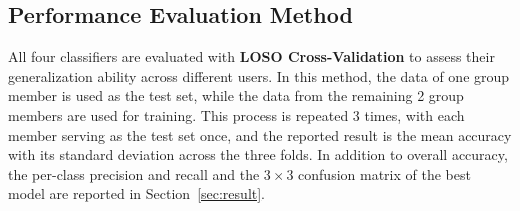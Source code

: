 \subsection{Performance Evaluation Method}
All four classifiers are evaluated with \textbf{LOSO Cross-Validation} to assess their generalization ability across different users. In this method, the data of one group member is used as the test set, while the data from the remaining 2 group members are used for training. This process is repeated 3 times, with each member serving as the test set once, and the reported result is the mean accuracy with its standard deviation across the three folds. In addition to overall accuracy, the per-class precision and recall and the $3\times3$ confusion matrix of the best model are reported in Section~\ref{sec:result}.